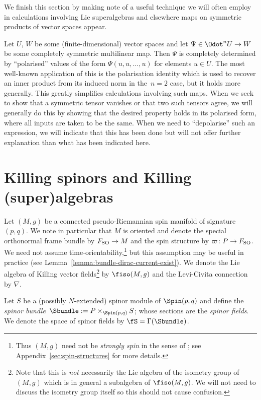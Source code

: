 We finish this section by making note of a useful technique we will often employ in calculations involving Lie superalgebras and elsewhere maps on symmetric products of vector spaces appear.

Let $U$, $W$ be some (finite-dimensional) vector spaces and let $\Psi\in\Odot^n U\to W$ be some completely symmetric multilinear map. Then $\Psi$ is completely determined by ``polarised'' values of the form $\Psi(u,u,\dots,u)$ for elements $u\in U$. The most well-known application of this is the polarisation identity which is used to recover an inner product from its induced norm in the~${n=2}$ case, but it holds more generally. This greatly simplifies calculations involving such maps. When we seek to show that a symmetric tensor vanishes or that two such tensors agree, we will generally do this by showing that the desired property holds in its polarised form, where all inputs are taken to be the same. When we need to ``depolarise'' such an expression, we will indicate that this has been done but will not offer further explanation than what has been indicated here.

\section{Killing spinors and Killing (super)algebras}
\label{sec:killing-spinors-superalgebras}

Let $(M,g)$ be a connected pseudo-Riemannian spin manifold of signature $(p,q)$. We note in particular that $M$ is oriented and denote the special orthonormal frame bundle by $F_{\rm SO}\to M$ and the spin structure by $\varpi\colon P\to F_{\rm SO}$. We need not assume time-orientability,\footnote{Thus $(M,g)$ need not be \emph{strongly spin} in the sense of \cite{Cortes2021,Shahbazi2024_2,Shahbazi2024_1}; see Appendix~\ref{sec:spin-structures} for more details.}
but this assumption may be useful in practice (see Lemma~\ref{lemma:bundle-dirac-current-exist}).
We denote the Lie algebra of Killing vector fields\footnote{Note that this is \emph{not} necessarily the Lie algebra of the isometry group of $(M,g)$ which is in general a subalgebra of $\fiso(M,g)$. We will not need to discuss the isometry group itself so this should not cause confusion.}
by $\fiso(M,g)$ and the Levi-Civita connection by $\nabla$.

Let $S$ be a (possibly $N$-extended) spinor module of $\Spin(p,q)$ and define the \emph{spinor bundle}~${\Sbundle:=P\times_{\Spin(p,q)} S}$; whose sections are the \emph{spinor fields}. We denote the space of spinor fields by $\fS=\Gamma(\Sbundle)$.

